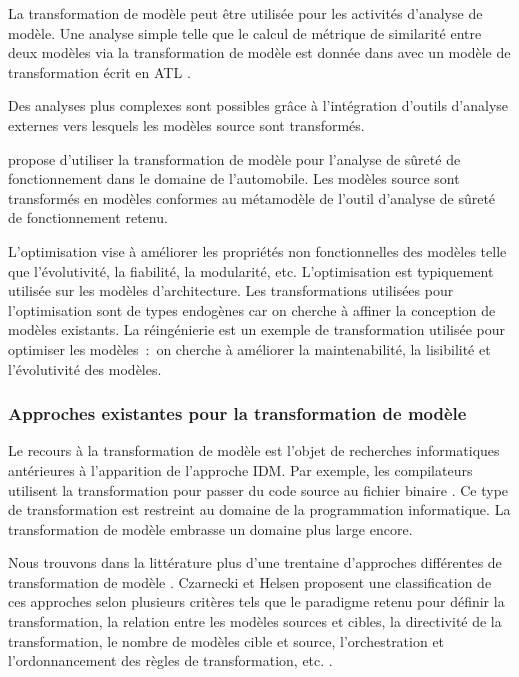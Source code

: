 \begin{description}
La transformation de modèle peut être utilisée pour les activités d'analyse de 
modèle. Une analyse simple telle que le calcul de métrique de similarité entre 
deux modèles via la transformation de modèle est donnée dans \cite{del2007semi} 
avec un modèle de transformation écrit en ATL \cite{jouault2006transforming}. 

Des analyses plus complexes sont possibles grâce à l'intégration d'outils 
d'analyse externes vers lesquels les modèles source sont transformés.

\cite{biehl2010integrating} propose d'utiliser la transformation de modèle pour 
l'analyse de sûreté de fonctionnement dans le domaine de l'automobile. Les 
modèles source sont transformés en modèles conformes au métamodèle de l'outil 
d'analyse de sûreté de fonctionnement retenu.
 
L'optimisation vise à améliorer les propriétés non fonctionnelles des modèles 
telle que l'évolutivité, la fiabilité, la modularité, etc. L'optimisation est 
typiquement utilisée sur les modèles d'architecture. Les transformations 
utilisées pour l'optimisation sont de types endogènes car on cherche à affiner 
la conception de modèles existants. La réingénierie est un exemple de 
transformation utilisée pour optimiser les modèles~:~on cherche à améliorer la 
maintenabilité, la lisibilité et l'évolutivité des modèles.

\end{description}

\subsubsection{Approches existantes pour la transformation de modèle}  
Le recours à la transformation de modèle est l'objet de recherches informatiques 
antérieures à l'apparition de l'approche IDM. Par exemple, les compilateurs 
utilisent la transformation pour passer du code source au fichier binaire 
\cite{aho1985compilers}. Ce type de transformation est restreint au domaine de 
la programmation informatique. La transformation de modèle embrasse un domaine 
plus large encore.

Nous trouvons dans la littérature plus d'une trentaine d'approches différentes 
de transformation de modèle \cite{syriani2011multi}. Czarnecki et Helsen 
proposent une classification de ces approches selon plusieurs critères tels que 
le paradigme retenu pour définir la transformation, la relation entre les 
modèles sources et cibles, la directivité de la transformation, le nombre de 
modèles cible et source, l'orchestration et l'ordonnancement des règles de 
transformation, etc. \cite{czarnecki2006feature}.


